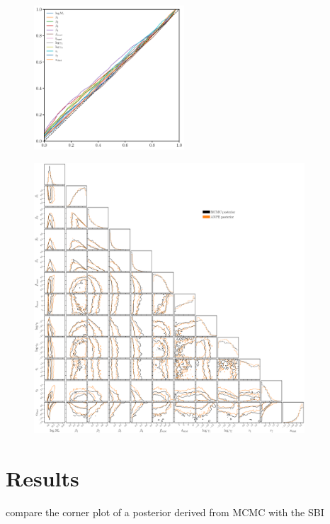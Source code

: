 \begin{figure}
\begin{center}
    \includegraphics[width=0.5\textwidth]{figs/ppplot.pdf}
    \caption{\label{fig:pp}
    }
\end{center}
\end{figure}

\begin{figure}
\begin{center}
    \includegraphics[width=0.9\textwidth]{figs/corner.pdf}
    \caption{\label{fig:corner}
    }
\end{center}
\end{figure}


\section{Results} \label{sec:results}
compare the corner plot of a posterior derived from MCMC with the SBI 



